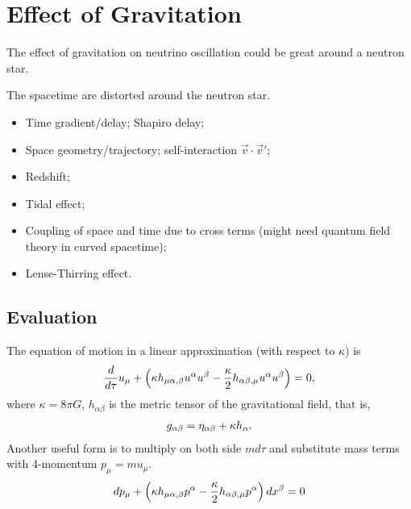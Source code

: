 \documentclass[letterpaper,12pt,english]{sphinxmanual}
\begin{document}
\chapter{Effect of Gravitation}
\label{gravity::doc}\label{gravity:effect-of-gravitation}
The effect of gravitation on neutrino oscillation could be great around a neutron star.

The spacetime are distorted around the neutron star.
\begin{itemize}
\item {} 
Time gradient/delay; Shapiro delay;

\item {} 
Space geometry/trajectory; self-interaction \(\vec v\cdot \vec v'\);

\item {} 
Redshift;

\item {} 
Tidal effect;

\item {} 
Coupling of space and time due to cross terms (might need quantum field theory in curved spacetime);

\item {} 
Lense-Thirring effect.

\end{itemize}


\section{Evaluation}
\label{gravity:evaluation}
The equation of motion in a linear approximation (with respect to  \(\kappa\)) is
\begin{gather}
\begin{split}\frac{d}{d\tau}u_\mu + \left( \kappa h_{\mu\alpha,\beta} u^\alpha u^\beta - \frac{\kappa}{2}h_{\alpha\beta,\mu}u^\alpha u^\beta \right) = 0,\end{split}\notag
\end{gather}
where \(\kappa=8\pi G\), \(h_{\alpha\beta}\) is the metric tensor of the gravitational field, that is,
\begin{gather}
\begin{split}g_{\alpha\beta} = \eta_{\alpha\beta} + \kappa h_{\alpha}.\end{split}\notag
\end{gather}
Another useful form is to multiply on both side \(m d\tau\) and substitute mass terms with 4-momentum \(p_\mu = m u_\mu\).
\begin{gather}
\begin{split}d p_\mu + \left( \kappa h_{\mu\alpha,\beta} p^\alpha - \frac{\kappa}{2} h_{\alpha\beta,\mu} p^\alpha \right) dx^{\beta} = 0\end{split}\notag
\end{gather}
\end{document}
